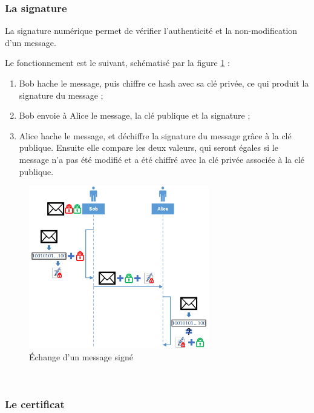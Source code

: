 
\subsubsection{La signature}

La signature numérique permet de vérifier l'authenticité et la non-modification d'un message.

Le fonctionnement est le suivant, schématisé par la figure \ref{signature} :
\begin{enumerate}
	\item Bob hache le message, puis chiffre ce hash avec sa clé privée, ce qui produit la signature du message ;
	\item Bob envoie à Alice le message, la clé publique et la signature ;
	\item Alice hache le message, et déchiffre la signature du message grâce à la clé publique. Ensuite elle compare les deux valeurs, qui seront égales si le message n'a pas été modifié et a été chiffré avec la clé privée associée à la clé publique.
\end{enumerate}
\begin{figure}[!h]
	\center
	\includegraphics[width=0.7\textwidth]{img/signature.png}
	\caption{Échange d'un message signé}
	\label{signature}
\end{figure}
~~\\


\subsubsection{Le certificat}

